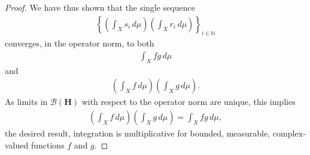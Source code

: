 \begin{proof}
We have thus shown that the single sequence
\begin{align}
    \left\{ \left( \int_X s_i \, d\mu \right) \left( \int_X r_i \, d\mu \right) \right\}_{i \in \mathbb{N}}
\end{align}
converges, in the operator norm, to both
\begin{align}
    \int_X fg \, d\mu
\end{align}
and
\begin{align}
    \left( \int_X f \, d\mu \right) \left( \int_X g \, d\mu \right).
\end{align}
As limits in $\mathcal{B}(\mathbf{H})$ with respect to the operator norm are unique, this implies
\begin{align}
    \left( \int_X f \, d\mu \right) \left( \int_X g \, d\mu \right) = \int_X fg \, d\mu,
\end{align}
the desired result, integration is multiplicative for bounded, measurable, complex-valued functions $f$ and $g$.
\end{proof}

